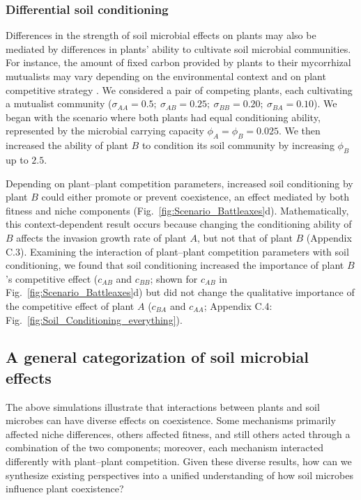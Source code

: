 \subsubsection*{Differential soil conditioning}
Differences in the strength of soil microbial effects on plants may also be mediated by differences in plants' ability to cultivate soil microbial communities. For instance, the amount of fixed carbon provided by plants to their mycorrhizal mutualists may vary depending on the environmental context \citep{Zheng2015, Norby1987} and on plant competitive strategy \citep{Hoeksema2010}. We considered a pair of competing plants, each cultivating a mutualist community ($\sigma_{AA} = 0.5;\ \sigma_{AB} = 0.25;\ \sigma_{BB} = 0.20;\ \sigma_{BA} = 0.10$). We began with the scenario where both plants had equal conditioning ability, represented by the microbial carrying capacity $\phi_{A} = \phi_{B} = 0.025$. We then increased the ability of plant $B$ to condition its soil community by increasing $\phi_{B}$ up to $2.5$.
\par


Depending on plant--plant competition parameters, increased soil conditioning by plant $B$ could either promote or prevent coexistence, an effect mediated by both fitness and niche components (Fig.~\ref{fig:Scenario_Battleaxes}d). Mathematically, this context-dependent result occurs because changing the conditioning ability of $B$ affects the invasion growth rate of plant $A$, but not that of plant $B$ (Appendix C.3). Examining the interaction of plant--plant competition parameters with soil conditioning, we found that soil conditioning increased the importance of plant $B$'s competitive effect ($c_{AB}$ and $c_{BB}$; shown for $c_{AB}$ in Fig.~\ref{fig:Scenario_Battleaxes}d) but did not change the qualitative importance of the competitive effect of plant $A$ ($c_{BA}$ and $c_{AA}$; Appendix C.4: Fig.~\ref{fig:Soil_Conditioning_everything}).
\par



\subsection{A general categorization of soil microbial effects}
The above simulations illustrate that interactions between plants and soil microbes can have diverse effects on coexistence. Some mechanisms primarily affected niche differences, others affected fitness, and still others acted through a combination of the two components; moreover, each mechanism interacted differently with plant--plant competition.
Given these diverse results, how can we synthesize existing perspectives into a unified understanding of how soil microbes influence plant coexistence?
\par


